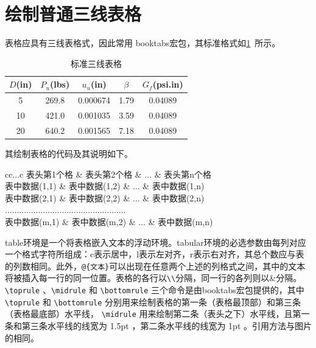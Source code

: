\section{绘制普通三线表格}
表格应具有三线表格式，因此常用 booktabs宏包，其标准格式如\cref{tab:001}~所示。
\begin{table}[!htbp]
    \caption{标准三线表格}\label{tab:001} \centering
    \begin{tabular}{ccccc}
        \toprule[1.5pt]
        $D$(in) & $P_u$(lbs) & $u_u$(in) & $\beta$ & $G_f$(psi.in)\\
        \midrule[1pt]
        5 & 269.8 & 0.000674 & 1.79 & 0.04089\\
        10 & 421.0 & 0.001035 & 3.59 & 0.04089\\
        20 & 640.2 & 0.001565 & 7.18 & 0.04089\\
        \bottomrule[1.5pt]
    \end{tabular}
\end{table}

其绘制表格的代码及其说明如下。
\begin{tcode}
    \begin{table}[!htbp]
        \caption[标签名]{中文标题}
        \begin{tabular}{cc...c}
            \toprule[1.5pt]
            表头第1个格   & 表头第2个格   & ... & 表头第n个格  \\
            \midrule[1pt]
            表中数据(1,1) & 表中数据(1,2) & ... & 表中数据(1,n)\\
            表中数据(2,1) & 表中数据(2,2) & ... & 表中数据(2,n)\\
            ...................................................\\
            表中数据(m,1) & 表中数据(m,2) & ... & 表中数据(m,n)\\
            \bottomrule[1.5pt]
        \end{tabular}
    \end{table}
\end{tcode}

\bigskip

table环境是一个将表格嵌入文本的浮动环境。tabular环境的必选参数由每列对应一个格式字符所组成：c表示居中，l表示左对齐，r表示右对齐，其总个数应与表的列数相同。此外，\verb|@{文本}|可以出现在任意两个上述的列格式之间，其中的文本将被插入每一行的同一位置。表格的各行以\verb|\\|分隔，同一行的各列则以\&分隔。 \verb|\toprule| 、\verb|\midrule| 和 \verb|\bottomrule| 三个命令是由booktabs宏包提供的，其中 \verb|\toprule| 和 \verb|\bottomrule| 分别用来绘制表格的第一条（表格最顶部）和第三条（表格最底部）水平线， \verb|\midrule| 用来绘制第二条（表头之下）水平线，且第一条和第三条水平线的线宽为 1.5pt ，第二条水平线的线宽为 1pt 。引用方法与图片的相同。
